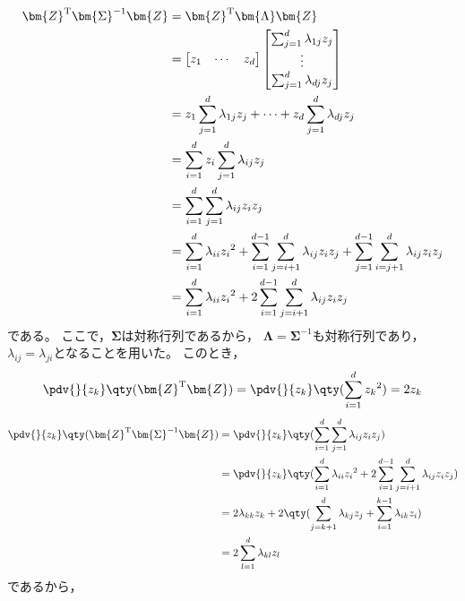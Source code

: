 \documentclass[class=jsarticle, crop=false, dvipdfmx, fleqn]{standalone}
\begin{document}
\begin{align}
    \bm{Z}^\mathrm{T} \bm{\Sigma}^{-1} \bm{Z}
        & = \bm{Z}^\mathrm{T} \bm{\Lambda} \bm{Z} \notag \\
        & = \begin{bmatrix} z_1 & \cdots & z_d \end{bmatrix}
            \begin{bmatrix}
                \sum_{j=1}^{d} \lambda_{1j} z_j \\
                \vdots \\
                \sum_{j=1}^{d} \lambda_{dj} z_j \\
            \end{bmatrix} \notag \\
        & = z_1 \sum_{j=1}^{d} \lambda_{1j} z_j + \cdots + z_d \sum_{j=1}^{d} \lambda_{dj} z_j \notag \\
        & = \sum_{i=1}^{d} z_i \sum_{j=1}^{d} \lambda_{ij} z_j \\
        & = \sum_{i=1}^{d} \sum_{j=1}^{d} \lambda_{ij} z_i z_j \\
        & = \sum_{i=1}^{d} \lambda_{ii} {z_i}^2 + \sum_{i=1}^{d-1} \sum_{j=i+1}^{d} \lambda_{ij} z_i z_j + \sum_{j=1}^{d-1} \sum_{i=j+1}^{d} \lambda_{ij} z_i z_j \\
        & = \sum_{i=1}^{d} \lambda_{ii} {z_i}^2 + 2\sum_{i=1}^{d-1} \sum_{j=i+1}^{d} \lambda_{ij} z_i z_j
\end{align}
である。
ここで，\(\bm{\Sigma}\)は対称行列であるから，
\(\bm{\Lambda} = \bm{\Sigma}^{-1}\)も対称行列であり，
\(\lambda_{ij} = \lambda_{ji}\)となることを用いた。
このとき，
\begin{equation}
    \pdv{}{z_k} \qty(\bm{Z}^\mathrm{T} \bm{Z})
        = \pdv{}{z_k} \qty(\sum_{i=1}^{d} {z_k}^2)
        = 2 z_k
\end{equation}
\begin{align}
    \pdv{}{z_k} \qty(\bm{Z}^\mathrm{T} \bm{\Sigma}^{-1} \bm{Z})
        & = \pdv{}{z_k} \qty(\sum_{i=1}^{d} \sum_{j=1}^{d} \lambda_{ij} z_i z_j) \\
        & = \pdv{}{z_k} \qty(\sum_{i=1}^{d} \lambda_{ii} {z_i}^2 + 2\sum_{i=1}^{d-1} \sum_{j=i+1}^{d} \lambda_{ij} z_i z_j) \\
        & = 2 \lambda_{kk} z_k + 2\qty(\sum_{j=k+1}^{d} \lambda_{kj} z_j + \sum_{i=1}^{k-1} \lambda_{ik} z_i) \\
        & = 2\sum_{l=1}^{d} \lambda_{kl} z_l
\end{align}
であるから，
\end{document}
